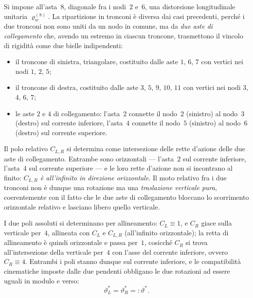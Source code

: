 \begin{esempio}
\begin{svolgimento}
		
		Si impone all'asta~$8$, diagonale fra i nodi~$2$ e~$6$, una
		distorsione longitudinale unitaria $\varrho_w^{(8)}$. La
		ripartizione in tronconi è diversa dai casi precedenti, perché i
		due tronconi non sono uniti da un nodo in comune, ma da \emph{due
			aste di collegamento} che, avendo un estremo in ciascun troncone,
		trasmettono il vincolo di rigidità come due bielle indipendenti:
		\begin{itemize}[noitemsep,topsep=2pt]
			\item il troncone di sinistra, triangolare, costituito dalle
			aste $1$, $6$, $7$ con vertici nei nodi $1$, $2$, $5$;
			\item il troncone di destra, costituito dalle aste $3$, $5$,
			$9$, $10$, $11$ con vertici nei nodi $3$, $4$, $6$, $7$;
			\item le aste $2$ e $4$ di collegamento: l'asta~$2$ connette il
			nodo~$2$ (sinistro) al nodo~$3$ (destro) sul corrente inferiore,
			l'asta~$4$ connette il nodo~$5$ (sinistro) al nodo~$6$ (destro)
			sul corrente superiore.
		\end{itemize}
		
		
		Il polo relativo $C_{L,R}$ si determina come intersezione delle
		rette d'azione delle due aste di collegamento. Entrambe sono
		orizzontali --- l'asta~$2$ sul corrente inferiore, l'asta~$4$ sul
		corrente superiore --- e le loro rette d'azione non si incontrano
		al finito: \emph{$C_{L,R}$ è all'infinito in direzione orizzontale}.
		Il moto relativo fra i due tronconi non è dunque una rotazione ma
		una \emph{traslazione verticale pura}, coerentemente con il fatto
		che le due aste di collegamento bloccano lo scorrimento orizzontale
		relativo e lasciano libero quello verticale.
		
		I due poli assoluti si determinano per allineamento: $C_L\equiv 1$,
		e $C_R$ giace sulla verticale per~$4$, allineata con $C_L$ e
		$C_{L,R}$ (all'infinito orizzontale); la retta di allineamento
		è quindi orizzontale e passa per~$1$, cosicché $C_R$ si trova
		all'intersezione della verticale per~$4$ con l'asse del corrente
		inferiore, ovvero $C_R\equiv 4$. Entrambi i poli stanno dunque
		sul corrente inferiore, e le compatibilità cinematiche imposte
		dalle due pendenti obbligano le due rotazioni ad essere uguali
		in modulo e verso:
		\begin{equation*}
			\vartheta_L^* = \vartheta_R^* =: \vartheta^*.
		\end{equation*}
		

\end{svolgimento}
\end{esempio}
